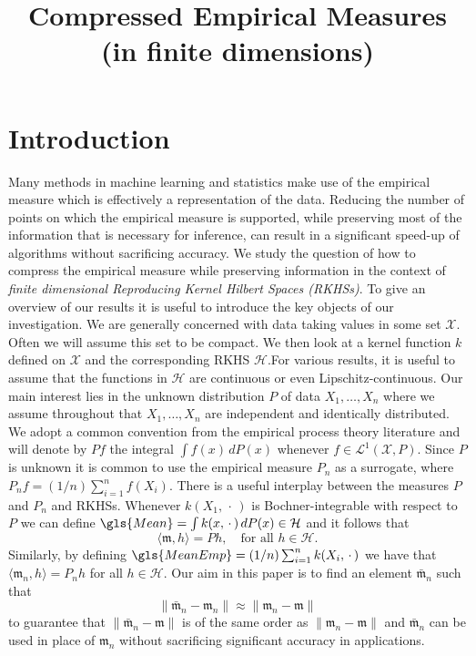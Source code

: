 \documentclass[AHL,Unicode,longabstracts,published]{cedram}
\title[Compressed Empirical Measures]{Compressed Empirical Measures (in finite dimensions)}
\author[\initial{S.} \lastname{Gr\"unew\"alder}]{\firstname{Steffen} \lastname{Gr\"unew\"alder}}
\theoremstyle{remark}
\newcommand{\X}{\mathcal{X}}
\newcommand{\cH}{\mathcal{H}}
\newcommand{\clL}{\mathcal{L}}
\newcommand{\mean}{\mathfrak{m}}
\begin{document}
\maketitle
\tableofcontents



\section{Introduction}

Many methods in machine learning and statistics make use of the empirical measure which is effectively a representation of the data. Reducing the number of points on which the empirical measure is supported, while preserving most of the information that is necessary for inference, can result in a significant speed-up of algorithms without sacrificing accuracy. We study the question of how to compress the empirical measure while preserving information in the context of \emph{finite dimensional Reproducing Kernel Hilbert Spaces (RKHSs)}. To give an overview of our results it is useful to introduce the key objects of our investigation. We are generally concerned with data taking values in some set $\X$. Often we will assume this set to be compact. We then look at a kernel function $k$ defined on $\X$ and the corresponding RKHS $\cH$.\linebreak For various results, it is useful to assume that the functions in $\cH$ are continuous or even Lipschitz-continuous. Our main interest lies in the unknown distribution $P$ of data $X_1,\dots, X_n$ where we assume throughout that $X_1,\dots,X_n$ are independent and identically distributed. We adopt a common convention from the empirical process theory literature and will denote by $Pf$ the integral $\int f(x) \,dP(x)$ whenever $f \in \clL^1(\X,P)$. Since $P$ is unknown it is common to use the empirical measure $P_n$ as a surrogate, where $P_n f = (1/n) \sum_{i=1}^n f(X_i)$. There is a useful interplay between the measures $P$ and $P_n$ and RKHSs. Whenever $k(X_1,\,\cdot\,)$ is Bochner-integrable with respect to $P$ we can define $\gls{Mean} = \int k(x,\,\cdot\,) \, dP(x) \in \cH$ and it follows that
\[
\langle \mean,h \rangle = Ph, \quad\text{for all } h \in \cH.
\]
Similarly, by defining $\gls{MeanEmp} = (1/n) \sum_{i=1}^n k(X_i,\,\cdot\,)$ we have that $\langle \mean_n,h \rangle = P_n h$ for all $h\in \cH$. Our aim in this paper is to find an element $\bar{\mean}_n$ such that
\[
\| \bar{\mean}_n - \mean_n \| \approx \| \mean_n - \mean\|
\]
to guarantee that $\| \bar{\mean}_n - \mean \|$ is of the same order as $\|\mean_n - \mean\|$ and $\bar{\mean}_n$ can be used in place of $\mean_n$ without sacrificing significant accuracy in applications.
\end{document}
